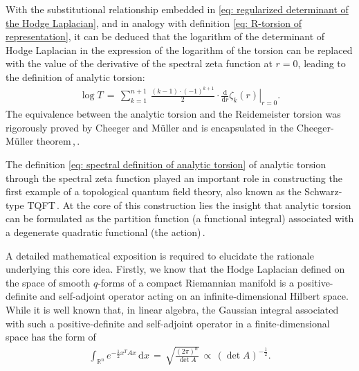 With the substitutional relationship embedded in \eqref{eq: regularized determinant of the Hodge Laplacian}, and in analogy with definition \eqref{eq: R-torsion of representation}, it can be deduced that the logarithm of the determinant of Hodge Laplacian in the expression of the logarithm of the torsion can be replaced with the value of the derivative of the spectral zeta function at $r=0$, leading to the definition of analytic torsion:
\begin{equation}\label{eq: spectral definition of analytic torsion}
    \begin{split}
        \log{T}\,=\,\sum_{k=1}^{n+1}\,\frac{\left(k-1\right)\cdot\left(-1\right)^{k+1}}{2}\cdot\left.\frac{\mathrm{d}}{\mathrm{d}r}\zeta_k\left(r\right)\right|_{r=0}.
    \end{split}
\end{equation}
The equivalence between the analytic torsion and the Reidemeister torsion was rigorously proved by Cheeger and M{\"u}ller and is encapsulated in the Cheeger-M{\"u}ller theorem\,\cite{cheeger1979AnalyticTorsion},\,\cite{muller1978AnalyticRTorsion}. 
\par The definition \eqref{eq: spectral definition of analytic torsion} of analytic torsion through the spectral zeta function played an important role in constructing the first example of a topological quantum field theory, also known as the Schwarz-type TQFT\,\cite{ASchwarz1979}. At the core of this construction lies the insight that analytic torsion can be formulated as the partition function (a functional integral) associated with a degenerate quadratic functional (the action)\,\cite{SchwarzQFTTopology}. 
\par A detailed mathematical exposition is required to elucidate the rationale underlying this core idea. Firstly, we know that the Hodge Laplacian defined on the space of smooth $q$-forms of a compact Riemannian manifold is a positive-definite and self-adjoint operator acting on an infinite-dimensional Hilbert space. While it is well known that, in linear algebra, the Gaussian integral associated with such a positive-definite and self-adjoint operator in a finite-dimensional space has the form of
\begin{equation}\label{eq: Gaussian integral in finite-dimensional case}
    \begin{split}
        \int_{\mathbb{R}^n}e^{-\frac{1}{2}x^{T}Ax}\,\mathrm{d}x\,=\,\sqrt{\frac{\left(2\pi\right)^n}{\det A}}\,\propto\,\left(\det A\right)^{-\frac{1}{2}}. 
    \end{split}
\end{equation}
